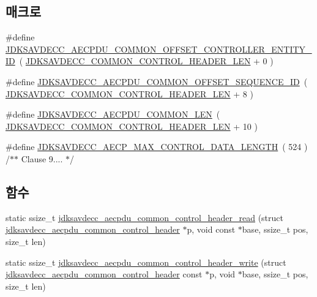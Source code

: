 \subsection*{매크로}
\begin{DoxyCompactItemize}
\item 
\#define \hyperlink{group__aecpdu_gad8107ecc9d0302457f6f9357b9734ae8}{J\+D\+K\+S\+A\+V\+D\+E\+C\+C\+\_\+\+A\+E\+C\+P\+D\+U\+\_\+\+C\+O\+M\+M\+O\+N\+\_\+\+O\+F\+F\+S\+E\+T\+\_\+\+C\+O\+N\+T\+R\+O\+L\+L\+E\+R\+\_\+\+E\+N\+T\+I\+T\+Y\+\_\+\+ID}~( \hyperlink{group__jdksavdecc__avtp__common__control__header_gaae84052886fb1bb42f3bc5f85b741dff}{J\+D\+K\+S\+A\+V\+D\+E\+C\+C\+\_\+\+C\+O\+M\+M\+O\+N\+\_\+\+C\+O\+N\+T\+R\+O\+L\+\_\+\+H\+E\+A\+D\+E\+R\+\_\+\+L\+EN} + 0 )
\item 
\#define \hyperlink{group__aecpdu_ga5c3a3a98f40fb1065dd70bcdcdc69480}{J\+D\+K\+S\+A\+V\+D\+E\+C\+C\+\_\+\+A\+E\+C\+P\+D\+U\+\_\+\+C\+O\+M\+M\+O\+N\+\_\+\+O\+F\+F\+S\+E\+T\+\_\+\+S\+E\+Q\+U\+E\+N\+C\+E\+\_\+\+ID}~( \hyperlink{group__jdksavdecc__avtp__common__control__header_gaae84052886fb1bb42f3bc5f85b741dff}{J\+D\+K\+S\+A\+V\+D\+E\+C\+C\+\_\+\+C\+O\+M\+M\+O\+N\+\_\+\+C\+O\+N\+T\+R\+O\+L\+\_\+\+H\+E\+A\+D\+E\+R\+\_\+\+L\+EN} + 8 )
\item 
\#define \hyperlink{group__aecpdu_ga1311febb873dfac7b4035ed25460f9d1}{J\+D\+K\+S\+A\+V\+D\+E\+C\+C\+\_\+\+A\+E\+C\+P\+D\+U\+\_\+\+C\+O\+M\+M\+O\+N\+\_\+\+L\+EN}~( \hyperlink{group__jdksavdecc__avtp__common__control__header_gaae84052886fb1bb42f3bc5f85b741dff}{J\+D\+K\+S\+A\+V\+D\+E\+C\+C\+\_\+\+C\+O\+M\+M\+O\+N\+\_\+\+C\+O\+N\+T\+R\+O\+L\+\_\+\+H\+E\+A\+D\+E\+R\+\_\+\+L\+EN} + 10 )
\item 
\#define \hyperlink{group__aecpdu_ga16d6beccf8eb0c78be5562572ded40c5}{J\+D\+K\+S\+A\+V\+D\+E\+C\+C\+\_\+\+A\+E\+C\+P\+\_\+\+M\+A\+X\+\_\+\+C\+O\+N\+T\+R\+O\+L\+\_\+\+D\+A\+T\+A\+\_\+\+L\+E\+N\+G\+TH}~( 524 ) /$\ast$$\ast$ Clause 9.... $\ast$/
\end{DoxyCompactItemize}
\subsection*{함수}
\begin{DoxyCompactItemize}
\item 
static ssize\+\_\+t \hyperlink{group__aecpdu_gae8aa0713d6c447632579d077bb12c19f}{jdksavdecc\+\_\+aecpdu\+\_\+common\+\_\+control\+\_\+header\+\_\+read} (struct \hyperlink{structjdksavdecc__aecpdu__common__control__header}{jdksavdecc\+\_\+aecpdu\+\_\+common\+\_\+control\+\_\+header} $\ast$p, void const $\ast$base, ssize\+\_\+t pos, size\+\_\+t len)
\item 
static ssize\+\_\+t \hyperlink{group__aecpdu_ga828eb506e6ecb72b56d72cd4e4fd433a}{jdksavdecc\+\_\+aecpdu\+\_\+common\+\_\+control\+\_\+header\+\_\+write} (struct \hyperlink{structjdksavdecc__aecpdu__common__control__header}{jdksavdecc\+\_\+aecpdu\+\_\+common\+\_\+control\+\_\+header} const $\ast$p, void $\ast$base, ssize\+\_\+t pos, size\+\_\+t len)
\end{DoxyCompactItemize}


